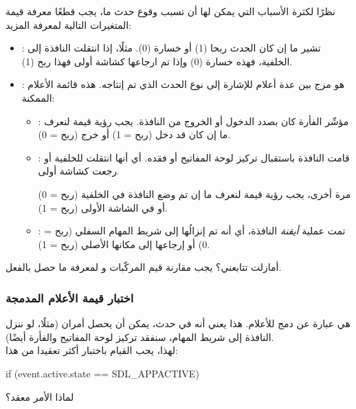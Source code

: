 نظرًا لكثرة الأسباب التي يمكن لها أن تسبب وقوع حدث ما، يجب قطعًا معرفة قيمة المتغيرات التالية لمعرفة المزيد:

\begin{itemize}
	\item {}:
تشير ما إن كان الحدث ربحا (1) أو خسارة (0). مثلًا، إذا انتقلت النافذة إلى الخلفية، فهذه خسارة (0) وإذا تم ارجاعها كشاشة أولى فهذا ربح (1).
	\item {}:
	هو مزج بين عدة أعلام للإشارة إلى نوع الحدث الذي تم إنتاجه. هذه قائمة الأعلام الممكنة:
	\begin{itemize}
		\item {}:
		مؤشّر الفأرة كان بصدد الدخول أو الخروج من النافذة. 
		يجب رؤية قيمة
		لنعرف ما إن كان قد دخل (ربح = 1) أو خرج (ربح = 0).
		\item {}:
		قامت النافذة باستقبال تركيز لوحة المفاتيح أو فقده. أي أنها انتقلت للخلفية أو رجعت كشاشة أولى.
		
		مرة أخرى، يجب رؤية قيمة 
		لنعرف ما إن تم وضع النافذة في الخلفية (ربح = 0) أو في الشاشة الأولى (ربح = 1).
		\item {}:
		تمت عملية
		\textit{أيقنة}
		النافذة، أي أنه تم إنزالُها إلى شريط المهام السفلي (ربح = 0) أو إرجاعها إلى مكانها الأصلي (ربح = 1).
	\end{itemize}
\end{itemize}

أمازلت تتابعني؟ يجب مقارنة قيم المركّبات
و
لمعرفة ما حصل بالفعل.

\subsubsection{اختبار قيمة الأعلام المدمجة}

هي عبارة عن دمج للأعلام. هذا يعني أنه في حدث، يمكن أن يحصل أمران (مثلًا، لو ننزل النافذة إلى شريط المهام، سنفقد تركيز لوحة المفاتيح والفأرة أيضًا).\\
لهذا، يجب القيام باختبار أكثر تعقيدا من هذا:

\begin{Csource}
if (event.active.state == SDL_APPACTIVE)
\end{Csource}

\begin{question}
لماذا الأمر معقد؟
\end{question}

